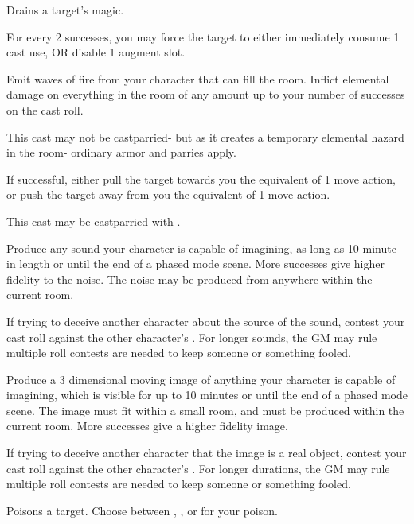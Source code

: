 \begin{GRPtablewide}
	{%
		Drains a target's magic.

		For every 2 successes, you may force the target to either immediately consume 1 cast use, OR disable 1 augment slot.
	}

	{%
	Emit waves of fire from your character that can fill the room. Inflict elemental damage on everything in the room of any amount up to your number of successes on the cast roll.

	This cast may not be castparried- but as it creates a temporary elemental hazard in the room- ordinary armor and parries apply.
	}

	{%
		If successful, either pull the target towards you the equivalent of 1 move action, or push the target away from you the equivalent of 1 move action.

		This cast may be castparried with .
	}

	{%
	Produce any sound your character is capable of imagining, as long as 10 minute in length or until the end of a phased mode scene. More successes give higher fidelity to the noise. The noise may be produced from anywhere within the current room.

	If trying to deceive another character about the source of the sound, contest your cast roll against the other character's . For longer sounds, the GM may rule multiple roll contests are needed to keep someone or something fooled.
	}

	{%
	Produce a 3 dimensional moving image of anything your character is capable of imagining, which is visible for up to 10 minutes or until the end of a phased mode scene. The image must fit within a small room, and must be produced within the current room. More successes give a higher fidelity image.

	If trying to deceive another character that the image is a real object, contest your cast roll against the other character's . For longer durations, the GM may rule multiple roll contests are needed to keep someone or something fooled.
	}

	{%
		Poisons a target.
		Choose between , , or  for your poison.

}
\end{GRPtablewide}
